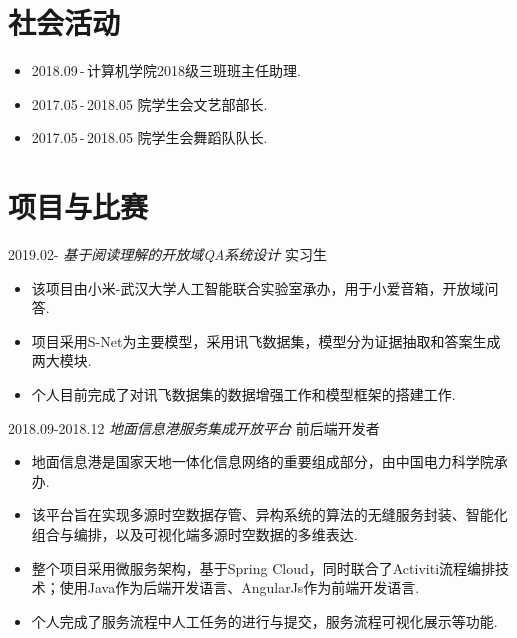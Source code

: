 \documentclass[letterpaper,AutoFakeBold]{twentysecondcv} %
\begin{document}
\newpage %
\makeprofile %




\section{\large 社会活动}


\begin{itemize}
	\setlength{\itemsep}{0pt}
	\setlength{\parsep}{0pt}
	\setlength{\parskip}{0pt}
	\item 2018.09\,-\,\qquad\qquad\quad 计算机学院2018级三班班主任助理.
	\item 2017.05\,-\,2018.05 \qquad 院学生会文艺部部长.
	\item 2017.05\,-\,2018.05 \qquad 院学生会舞蹈队队长.
\end{itemize}


\section{\large 项目与比赛}

2019.02- \qquad \qquad \quad \emph{ 基于阅读理解的开放域QA系统设计 } \hfill 实习生
\begin{itemize}
	\setlength{\itemsep}{0pt}
	\setlength{\parsep}{0pt}
	\setlength{\parskip}{0pt}
	\item 
	该项目由小米-武汉大学人工智能联合实验室承办，用于小爱音箱，开放域问答.
	\item
	项目采用S-Net为主要模型，采用讯飞数据集，模型分为证据抽取和答案生成两大模块.
	\item 
	个人目前完成了对讯飞数据集的数据增强工作和模型框架的搭建工作.
\end{itemize}

2018.09-2018.12 \qquad \emph{ 地面信息港服务集成开放平台 } \hfill 前后端开发者
\begin{itemize}
	\setlength{\itemsep}{0pt}
	\setlength{\parsep}{0pt}
	\setlength{\parskip}{0pt}
	\item 
	地面信息港是国家天地一体化信息网络的重要组成部分，由中国电力科学院承办.
	\item
	该平台旨在实现多源时空数据存管、异构系统的算法的无缝服务封装、智能化组合与编排，以及可视化端多源时空数据的多维表达.
	\item 
	整个项目采用微服务架构，基于Spring Cloud，同时联合了Activiti流程编排技术；使用Java作为后端开发语言、AngularJs作为前端开发语言.
	\item 
	个人完成了服务流程中人工任务的进行与提交，服务流程可视化展示等功能.
\end{itemize}
\end{document}
